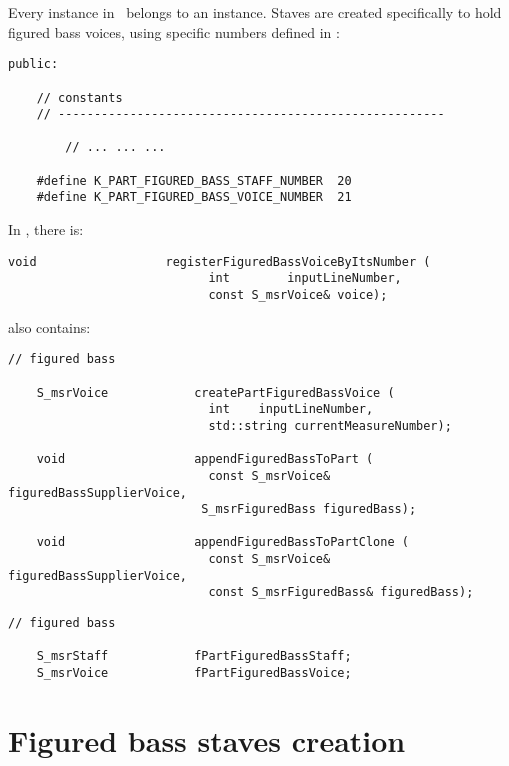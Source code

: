 Every  instance in \mf\ belongs to an  instance. Staves are created specifically to hold figured bass voices, using specific numbers defined in :
\begin{lstlisting}[language=CPlusPlus]
  public:

    // constants
    // ------------------------------------------------------

		// ... ... ...

    #define K_PART_FIGURED_BASS_STAFF_NUMBER  20
    #define K_PART_FIGURED_BASS_VOICE_NUMBER  21
\end{lstlisting}

In , there is:
\begin{lstlisting}[language=CPlusPlus]
     void                  registerFiguredBassVoiceByItsNumber (
                            int        inputLineNumber,
                            const S_msrVoice& voice);
\end{lstlisting}

 also contains:
\begin{lstlisting}[language=CPlusPlus]
    // figured bass

    S_msrVoice            createPartFiguredBassVoice (
                            int    inputLineNumber,
                            std::string currentMeasureNumber);

    void                  appendFiguredBassToPart (
                            const S_msrVoice&             figuredBassSupplierVoice,
                           S_msrFiguredBass figuredBass);

    void                  appendFiguredBassToPartClone (
                            const S_msrVoice&              figuredBassSupplierVoice,
                            const S_msrFiguredBass& figuredBass);
\end{lstlisting}

\begin{lstlisting}[language=CPlusPlus]
    // figured bass

    S_msrStaff            fPartFiguredBassStaff;
    S_msrVoice            fPartFiguredBassVoice;
\end{lstlisting}


\section{Figured bass staves creation}


